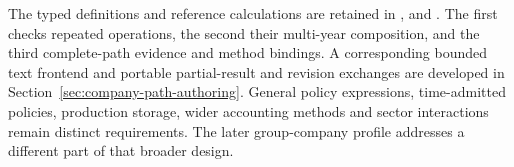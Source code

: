 The typed definitions and reference calculations are retained in
,
 and
.
The first checks repeated operations, the second their multi-year composition,
and the third complete-path evidence and method bindings. A corresponding
bounded text frontend and portable partial-result and revision exchanges are
developed in Section~\ref{sec:company-path-authoring}. General policy expressions,
time-admitted policies, production storage, wider accounting methods and sector
interactions remain distinct requirements. The later group-company profile
addresses a different part of that broader design.


